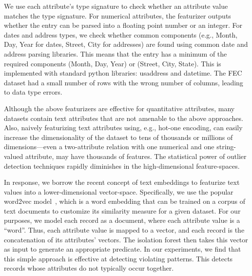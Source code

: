 We use each attribute's type signature to check whether an attribute value matches the type signature.  For numerical attributes, the featurizer outputs whether the entry can be parsed into a floating point number or an integer. For dates and address types, we check whether common components (e.g., Month, Day, Year for dates, Street, City for addresses) are found using common date and address parsing libraries.   This means that the entry has a minimum of the required components (Month, Day, Year) or (Street, City, State).  This is implemented with standard python libraries: \textsf{usaddress} and \textsf{datetime}. The FEC dataset had a small number of rows with the wrong number of columns, leading to data type errors.

Although the above featurizers are effective for quantitative attributes, many datasets contain text attributes that are not amenable to the above approaches.  Also, naively featurizing text attributes using, e.g., hot-one encoding, can easily increase the dimensionality of the dataset to tens of thousands or millions of dimensions---even a two-attribute relation with one numerical and one string-valued attribute, may have thousands of features.  The statistical power of outlier detection techniques rapidly diminishes in the high-dimensional feature-spaces.

In response, we borrow the recent concept of text embeddings to featurize text values into a lower-dimensional vector-space.  Specifically, we use the popular \textsf{word2vec} model~\cite{mikolov2013distributed}, which is a word embedding that can be trained on a corpus of text documents to customize its similarity measure for a given dataset.  For our purposes, we model each record as a document, where each attribute value is a ``word''.  Thus, each attribute value is mapped to a vector, and each record is the concatenation of its attributes' vectors.  The isolation forest then takes this vector as input to generate an appropriate predicate.  In our experiments, we find that this simple approach is effective at detecting violating patterns. This detects records whose attributes do not typically occur together. 
 


 
